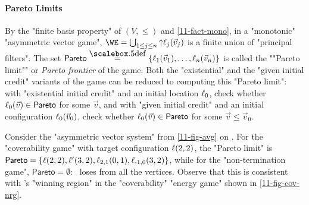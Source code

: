 \paragraph{Pareto Limits}\AP By the "finite basis property" of
$(V,{\leq})$ and \cref{11-fact-mono}, in a "monotonic" "asymmetric
vector game", $\WE=\bigcup_{1\leq j\leq n}{\uparrow}\loc_j(\vec v_j)$
is a finite union of "principal filters".  The set
$\mathsf{Pareto}\eqdef\{\loc_1(\vec v_1),\dots,\loc_n(\vec v_n)\}$ is
called the ""Pareto limit"" or \emph{Pareto frontier} of the game.
Both the "existential" and the "given initial credit" variants of the
game can be reduced to computing this "Pareto limit": with
"existential initial credit" and an initial location $\ell_0$, check
whether $\ell_0(\vec v)\in\mathsf{Pareto}$ for some $\vec v$, and with
"given initial credit" and an initial configuration $\ell_0(\vec v_0)$, check
whether $\ell_0(\vec v)\in\mathsf{Pareto}$ for some $\vec v\leq\vec
v_0$.
\begin{example}
  Consider the "asymmetric vector system" from \cref{11-fig-avg} on
  .  For the "coverability game" with target
  configuration $\ell(2,2)$, the "Pareto limit" is
  $\mathsf{Pareto}=\{\ell(2,2),\ell'(3,2),\ell_{2,1}(0,1),\ell_{\text-1,0}(3,2)\}$,
  while for the "non-termination game", $\mathsf{Pareto}=\emptyset$:
  \Eve\ loses from all the vertices.  Observe that this is consistent
  with \Eve's "winning region" in the "coverability" "energy game"
  shown in \cref{11-fig-cov-nrg}.
\end{example}


